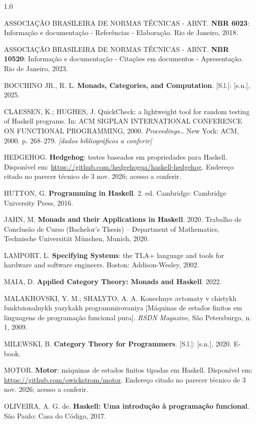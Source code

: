 \documentclass[12pt,a4paper]{article}
\begin{document}
\begingroup
\setlength{\parindent}{0pt}
\setlength{\parskip}{0.6em}
\begin{spacing}{1.0}

ASSOCIAÇÃO BRASILEIRA DE NORMAS TÉCNICAS - ABNT. \textbf{NBR 6023}: Informação e documentação - Referências - Elaboração. Rio de Janeiro, 2018.

ASSOCIAÇÃO BRASILEIRA DE NORMAS TÉCNICAS - ABNT. \textbf{NBR 10520}: Informação e documentação - Citações em documentos - Apresentação. Rio de Janeiro, 2023.

BOCCHINO JR., R. L. \textbf{Monads, Categories, and Computation}. [S.l.]: [s.n.], 2025.

CLAESSEN, K.; HUGHES, J. QuickCheck: a lightweight tool for random testing of Haskell programs. In: ACM SIGPLAN INTERNATIONAL CONFERENCE ON FUNCTIONAL PROGRAMMING, 2000. \textit{Proceedings}\ldots{} New York: ACM, 2000. p. 268--279. \textit{[dados bibliográficos a conferir]}

HEDGEHOG. \textbf{Hedgehog}: testes baseados em propriedades para Haskell. Disponível em: \url{https://github.com/hedgehogqa/haskell-hedgehog}. Endereço citado no parecer técnico de 3 nov. 2026; acesso a conferir.

HUTTON, G. \textbf{Programming in Haskell}. 2. ed. Cambridge: Cambridge University Press, 2016.

JAHN, M. \textbf{Monads and their Applications in Haskell}. 2020. Trabalho de Conclusão de Curso (Bachelor's Thesis) -- Department of Mathematics, Technische Universität München, Munich, 2020.

LAMPORT, L. \textbf{Specifying Systems}: the TLA+ language and tools for hardware and software engineers. Boston: Addison-Wesley, 2002.

MAIA, D. \textbf{Applied Category Theory: Monads and Haskell}. 2022.

MALAKHOVSKI, Y. M.; SHALYTO, A. A. Konechnye avtomaty v chistykh funktsionalnykh yazykakh programmirovaniya [Máquinas de estados finitos em linguagens de programação funcional pura]. \textit{RSDN Magazine}, São Petersburgo, n. 1, 2009.

MILEWSKI, B. \textbf{Category Theory for Programmers}. [S.l.]: [s.n.], 2020. E-book.

MOTOR. \textbf{Motor}: máquinas de estados finitos tipadas em Haskell. Disponível em: \url{https://github.com/owickstrom/motor}. Endereço citado no parecer técnico de 3 nov. 2026; acesso a conferir.

OLIVEIRA, A. G. de. \textbf{Haskell: Uma introdução à programação funcional}. São Paulo: Casa do Código, 2017.


\end{spacing}
\end{document}
